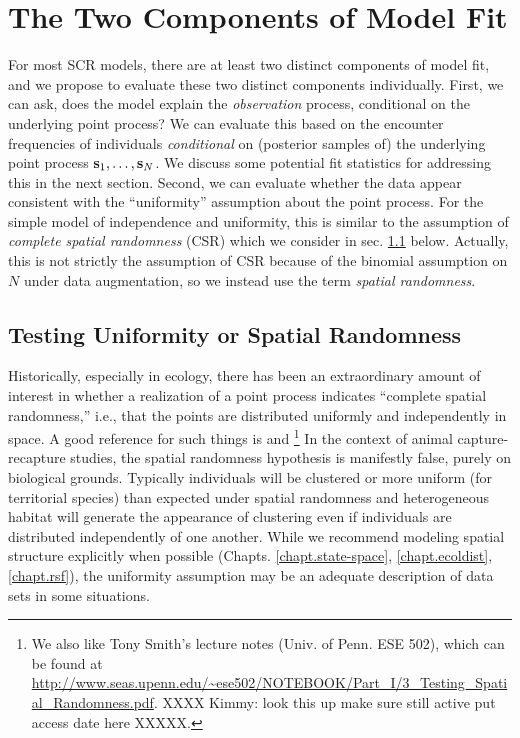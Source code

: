 \section{The Two Components of Model Fit}

For most SCR models, there are at least two distinct components of
model fit, and we propose to evaluate these two distinct components
individually.  First, we can ask, does the model explain the {\it
  observation} process, conditional on the underlying point process?
We can evaluate this based on the encounter frequencies of individuals
{\it conditional} on (posterior samples of) the underlying point
process ${\bf s}_{1}, \ldots, {\bf s}_{N}$.  We discuss some potential
fit statistics for addressing this in the next section.  Second, we
can evaluate whether the data appear consistent with the
``uniformity'' assumption about the point process.  For the simple
model of independence and uniformity, this is similar to the
assumption of {\it complete spatial randomness} (CSR) which we
consider in sec. \ref{gof.sec.csr} below. Actually, this is not
strictly the assumption of CSR because of the binomial assumption on
$N$ under data augmentation, so we instead use the term {\it spatial
  randomness}.


\subsection{Testing Uniformity or Spatial Randomness}
\label{gof.sec.csr}


Historically, especially in ecology, there has been an extraordinary
amount of interest in whether a realization of a point process
indicates ``complete spatial randomness,'' i.e., that the points are
distributed uniformly and independently in space.  A good reference
for such things is \citet[][Ch. 8]{cressie:1992} and
\citet{illian_etal:2008}\footnote{We also like Tony Smith's lecture
  notes (Univ. of Penn. ESE 502), which can be found at
  \url{http://www.seas.upenn.edu/~ese502/NOTEBOOK/Part_I/3_Testing_Spatial_Randomness.pdf}.
  XXXX
Kimmy: look this up make sure still active put access date here
  XXXXX.  } In the context of animal capture-recapture studies, the
spatial randomness hypothesis is manifestly false, purely on
biological grounds. Typically individuals will be clustered or more
uniform (for territorial species) than expected under spatial
randomness and heterogeneous habitat will generate the appearance of
clustering even if individuals are distributed independently of one
another. While we recommend modeling spatial structure explicitly when
possible (Chapts. \ref{chapt.state-space}, \ref{chapt.ecoldist},
\ref{chapt.rsf}), the uniformity assumption may be an adequate
description of data sets in some situations.


